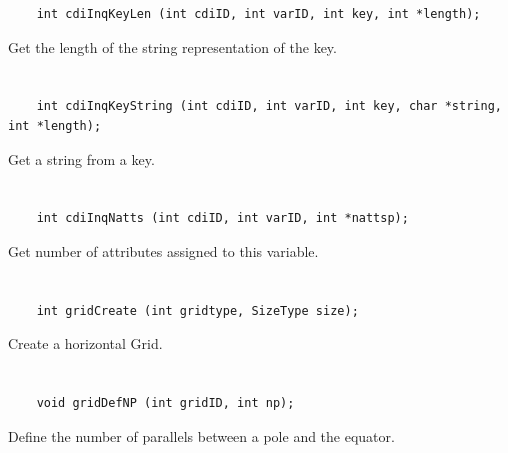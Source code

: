 \begin{verbatim}
    int cdiInqKeyLen (int cdiID, int varID, int key, int *length);
\end{verbatim}

Get the length of the string representation of the key.


\section*{\tt {}}

\begin{verbatim}
    int cdiInqKeyString (int cdiID, int varID, int key, char *string, int *length);
\end{verbatim}

Get a string from a key.


\section*{\tt {}}

\begin{verbatim}
    int cdiInqNatts (int cdiID, int varID, int *nattsp);
\end{verbatim}

Get number of attributes assigned to this variable.


\section*{\tt {}}

\begin{verbatim}
    int gridCreate (int gridtype, SizeType size);
\end{verbatim}

Create a horizontal Grid.


\section*{\tt {}}

\begin{verbatim}
    void gridDefNP (int gridID, int np);
\end{verbatim}

Define the number of parallels between a pole and the equator.


\section*{\tt {}}

